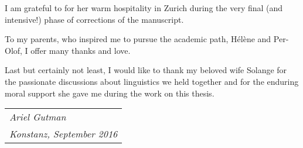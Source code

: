 I am grateful to  for her warm hospitality in Zurich  during the very final (and intensive!) phase of corrections of the manuscript. 

To my parents, who inspired me to pursue the academic path, Hélène and Per-Olof, I offer many thanks and love. 

Last but certainly not least, I would like to thank my beloved wife Solange for the passionate discussions about linguistics we held together and for the enduring moral support she gave me during the work on this thesis.

\begin{flushright}
\begin{tabular}{l}
\textit{Ariel Gutman} \\
\textit{Konstanz, September 2016} \\
\end{tabular}
\end{flushright}





